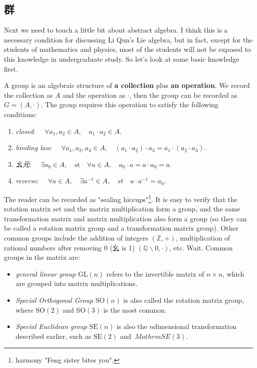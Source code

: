 \subsection{群}
  
  
  Next we need to touch a little bit about abstract algebra. I think this is a necessary condition for discussing Li Qun's Lie algebra, but in fact, except for the students of mathematics and physics, most of the students will not be exposed to this knowledge in undergraduate study. So let's look at some basic knowledge first.

  A group is an algebraic structure of \textbf{a collection} plus \textbf{an operation}. We record the collection as $A$ and the operation as $\cdot$, then the group can be recorded as $G=(A,\cdot)$. The group requires this operation to satisfy the following conditions:

  \begin{enumerate}
  \item { \emph{closed}}: $ \quad \forall a_1, a_2 \in A, \quad a_1 \cdot a_2 \in A$.
  \item { \emph{binding law}}: $ \quad \forall a_1, a_2, a_3 \in A, \quad (a_1 \cdot a_2) \cdot a_3 = a_1 \cdot ( a_2 \cdot a_3) $.
  \item { \emph{幺元}}: $ \quad \exists a_0 \in A, \quad \mathrm{st} \quad \forall a \in A, \quad a_0 \cdot a = a \cdot a_0 = a $.
  \item { \emph{reverse}}: $ \quad \forall a \in A, \quad \exists a^{-1} \in A, \quad st \quad a \cdot a^{-1} = a_0 $.
  \end{enumerate}

  The reader can be recorded as "sealing hiccups"\footnote{harmony "Feng sister bites you". }. It is easy to verify that the rotation matrix set and the matrix multiplication form a group, and the same transformation matrix and matrix multiplication also form a group (so they can be called a rotation matrix group and a transformation matrix group). Other common groups include the addition of integers $(\mathbb{Z}, +)$, multiplication of rational numbers after removing 0 (幺 is 1) $(\mathbb{Q}\backslash 0, \cdot )$, etc. Wait. Common groups in the matrix are:

  \begin{itemize}
  \item \emph{general linear group $\mathrm{GL}(n)$} \quad refers to the invertible matrix of $n \times n$, which are grouped into matrix multiplications.

  \item \emph{Special Orthogonal Group $\mathrm{SO}(n)$} \quad is also called the rotation matrix group, where $\mathrm{SO}(2)$ and $\mathrm{SO}(3 ) $ is the most common.

  \item \emph{Special Euclidean group $\mathrm{SE}(n)$} \quad is also the $n$dimensional transformation described earlier, such as $\mathrm{SE}(2)$ and $\ Mathrm{SE}(3)$.
  \end{itemize}

